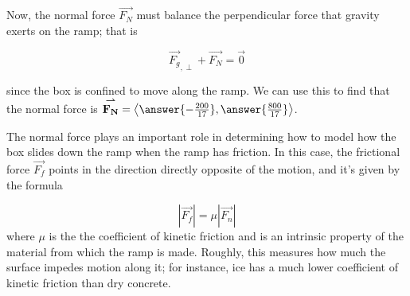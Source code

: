 \documentclass{ximera}
\begin{document}
\begin{example}
\begin{explanation}
    Now, the normal force $\vec{F_N}$ must balance the perpendicular force that gravity exerts on the ramp; that is
    
    \[
     \vec{F_g}_{, \perp} +\vec{F_N} = \vec{0}
    \]
    
    since the box is confined to move along the ramp.  We can use this to find that the normal force is $\vec{F_N} = \vector{ \answer{-\frac{200}{17}},\answer{\frac{800}{17}}}$.
    
    \begin{remark}
    The normal force plays an important role in determining how to model how the box slides down the ramp when the ramp has friction.  In this case, the frictional force $\vec{F_f}$ points in the direction directly opposite of the motion, and it's given by the formula
    
\[
    |\vec{F_f}| =  \mu |\vec{F_n}|
\]
where $\mu$ is the the coefficient of kinetic friction and is an intrinsic property of the material from which the ramp is made.  Roughly, this measures how much the surface impedes motion along it; for instance, ice has a much lower coefficient of kinetic friction than dry concrete.       
    \end{remark}
\end{explanation}
\end{example}
\end{document}

